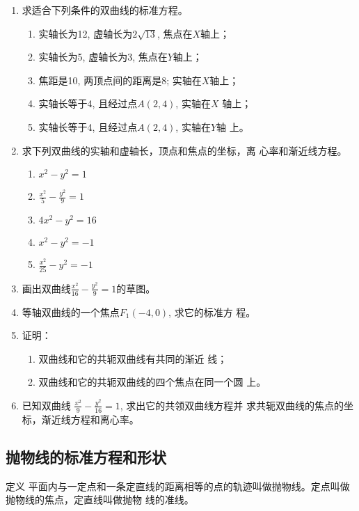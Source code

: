 \begin{ex}
\begin{enumerate}
    \item 求适合下列条件的双曲线的标准方程。
\begin{enumerate}
\item 实轴长为12, 虚轴长为$2\sqrt{13}$, 
    焦点在$X$轴上；
    \item 实轴长为5, 虚轴长为3, 焦点在$Y$轴上；
    \item 焦距是10, 两顶点间的距离是8; 
    实轴在$X$轴上；
    \item 实轴长等于4, 且经过点$A(2,4)$, 实轴在$X$
    轴上；
    \item 实轴长等于4, 且经过点$A(2,4)$, 实轴在$Y$轴
    上。
\end{enumerate}
\item 求下列双曲线的实轴和虚轴长，顶点和焦点的坐标，离
心率和渐近线方程。
\begin{multicols}{2}
\begin{enumerate}
    \item $x^2-y^2=1$
    \item $\frac{x^2}{5}-\frac{y^2}{9}=1$
    \item $4x^2-y^2=16$
    \item $x^2-y^2=-1$
    \item $\frac{x^2}{25}-y^2=-1$
\end{enumerate}
\end{multicols}

\item 画出双曲线$\frac{x^2}{16}-\frac{y^2}{9}=1$的草图。
\item 等轴双曲线的一个焦点$F_1(-4,0)$, 求它的标准方
程。
\item 证明：
\begin{enumerate}
\item 双曲线和它的共轭双曲线有共同的渐近
线；
\item 双曲线和它的共轭双曲线的四个焦点在同一个圆
上。
\end{enumerate}

\item 已知双曲线
$\frac{x^2}{9}-\frac{y^2}{16}=1$, 求出它的共领双曲线方程并
求共轭双曲线的焦点的坐标，渐近线方程和离心率。
\end{enumerate}
\end{ex}

\subsection{抛物线的标准方程和形状}
\begin{blk}
   {定义}
平面内与一定点和一条定直线的距离相等的点的轨迹叫做抛物线。定点叫做抛物线的焦点，定直线叫做抛物
线的准线。
\end{blk}

